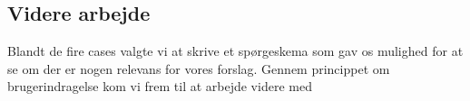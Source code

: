 \subsection{Videre arbejde}
Blandt de fire cases valgte vi at skrive et spørgeskema som gav os mulighed for at se om der er nogen relevans for vores forslag. Gennem princippet om brugerindragelse kom vi frem til at arbejde videre med  